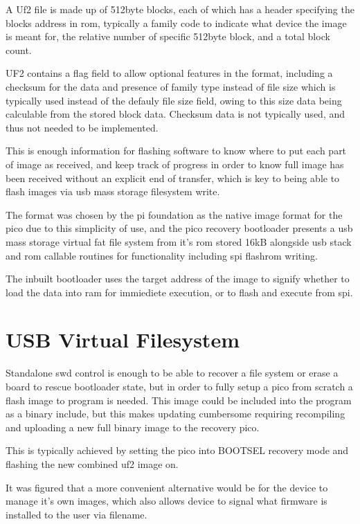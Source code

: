 A Uf2 file is made up of 512byte blocks, each of which has a header specifying the blocks address in \gls{rom}, typically a family code to indicate what device the image is meant for, the relative number of specific 512byte block, and a total block count. 

UF2 contains a flag field to allow optional features in the format, including a checksum for the data and presence of family type instead of file size which is typically used instead of the defauly file size field, owing to this size data being calculable from the stored block data. Checksum data is not typically used, and thus not needed to be implemented.

This is enough information for flashing software to know where to put each part of image as received, and keep track of progress in order to know full image has been received without an explicit end of transfer, which is key to being able to flash images via \gls{usb} mass storage filesystem write.

The format was chosen by the pi foundation as the native image format for the pico due to this simplicity of use, and the pico recovery bootloader presents a \gls{usb} mass storage virtual \gls{fat} file system from it's \gls{rom} stored 16kB alongside \gls{usb} stack and \gls{rom} callable routines for functionality including \gls{spi} flashrom writing.

The inbuilt bootloader uses the target address of the image to signify whether to load the data into ram for immiediete execution, or to flash and execute from \gls{spi}.

\clearpage
\section{USB Virtual Filesystem}
Standalone \gls{swd} control is enough to be able to recover a file system or erase a board to rescue bootloader state, but in order to fully setup a pico from scratch a flash image to program is needed. This image could be included into the program as a binary include, but this makes updating cumbersome requiring recompiling and uploading a new full binary image to the recovery pico.

This is typically achieved by setting the pico into BOOTSEL recovery mode and flashing the new combined uf2 image on.

It was figured that a more convenient alternative would be for the device to manage it's own images, which also allows device to signal what firmware is installed to the user via filename.

